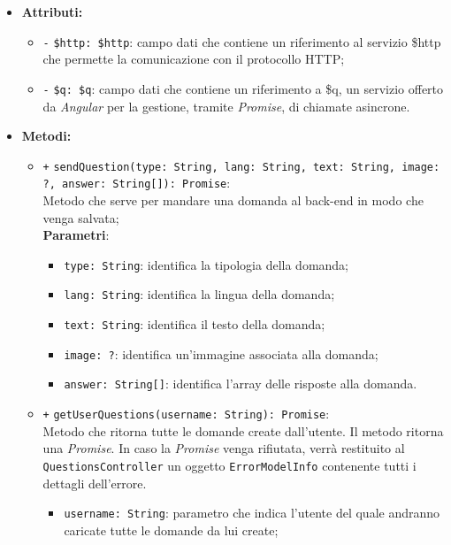 \begin{itemize}
\begin{itemize}
	\end{itemize}
	\item \textbf{Attributi:}
	\begin{itemize}
		\item \texttt{-} \texttt{\$http: \$http}: campo dati che contiene un riferimento al servizio \$http che permette la comunicazione con il protocollo HTTP;
		\item \texttt{-} \texttt{\$q: \$q}: campo dati che contiene un riferimento a \$q, un servizio offerto da \textit{Angular} per la gestione, tramite \textit{Promise}, di chiamate asincrone.
	\end{itemize}
	\item \textbf{Metodi:}
	\begin{itemize}
		\item \texttt{+} \texttt{sendQuestion(type: String, lang: String, text: String, image: ?, answer: String[]): Promise}: \\Metodo che serve per mandare una domanda al back-end in modo che venga salvata;\\ 
		\textbf{Parametri}: 
		\begin{itemize}
			\item \texttt{type: String}: identifica la tipologia della domanda;
			\item \texttt{lang: String}: identifica la lingua della domanda;
			\item \texttt{text: String}: identifica il testo della domanda;
			\item \texttt{image: ?}: identifica un'immagine associata alla domanda;
			\item \texttt{answer: String[]}: identifica l'array delle risposte alla domanda.
		\end{itemize}
		\item \texttt{+} \texttt{getUserQuestions(username: String): Promise}: \\Metodo che ritorna tutte le domande create dall'utente. Il metodo ritorna una \textit{Promise}. In caso la \textit{Promise} venga rifiutata, verrà restituito al \texttt{QuestionsController} un oggetto \texttt{ErrorModelInfo} contenente tutti i dettagli dell'errore. \\
		\begin{itemize}
			\item \texttt{username: String}: parametro che indica l'utente del quale andranno caricate tutte le domande da lui create;
		\end{itemize}
	\end{itemize}
\end{itemize}

